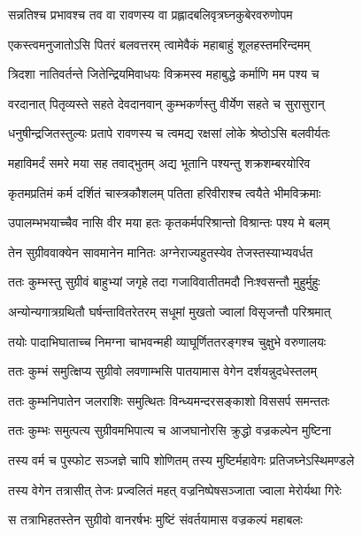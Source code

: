\twolineshloka
{सन्नतिश्च प्रभावश्च तव वा रावणस्य वा}
{प्रह्लादबलिवृत्रघ्नकुबेरवरुणोपम} %

\twolineshloka
{एकस्त्वमनुजातोऽसि पितरं बलवत्तरम्}
{त्वामेवैकं महाबाहुं शूलहस्तमरिन्दमम्} %

\twolineshloka
{त्रिदशा नातिवर्तन्ते जितेन्द्रियमिवाधयः}
{विक्रमस्व महाबुद्धे कर्माणि मम पश्य च} %

\twolineshloka
{वरदानात् पितृव्यस्ते सहते देवदानवान्}
{कुम्भकर्णस्तु वीर्येण सहते च सुरासुरान्} %

\twolineshloka
{धनुषीन्द्रजितस्तुल्यः प्रतापे रावणस्य च}
{त्वमद्य रक्षसां लोके श्रेष्ठोऽसि बलवीर्यतः} %

\twolineshloka
{महाविमर्दं समरे मया सह तवाद्भुतम्}
{अद्य भूतानि पश्यन्तु शक्रशम्बरयोरिव} %

\twolineshloka
{कृतमप्रतिमं कर्म दर्शितं चास्त्रकौशलम्}
{पतिता हरिवीराश्च त्वयैते भीमविक्रमाः} %

\twolineshloka
{उपालम्भभयाच्चैव नासि वीर मया हतः}
{कृतकर्मपरिश्रान्तो विश्रान्तः पश्य मे बलम्} %

\twolineshloka
{तेन सुग्रीववाक्येन सावमानेन मानितः}
{अग्नेराज्यहुतस्येव तेजस्तस्याभ्यवर्धत} %

\twolineshloka
{ततः कुम्भस्तु सुग्रीवं बाहुभ्यां जगृहे तदा}
{गजाविवातीतमदौ निःश्वसन्तौ मुहुर्मुहुः} %

\twolineshloka
{अन्योन्यगात्रग्रथितौ घर्षन्तावितरेतरम्}
{सधूमां मुखतो ज्वालां विसृजन्तौ परिश्रमात्} %

\twolineshloka
{तयोः पादाभिघाताच्च निमग्ना चाभवन्मही}
{व्याघूर्णिततरङ्गश्च चुक्षुभे वरुणालयः} %

\twolineshloka
{ततः कुम्भं समुत्क्षिप्य सुग्रीवो लवणाम्भसि}
{पातयामास वेगेन दर्शयन्नुदधेस्तलम्} %

\twolineshloka
{ततः कुम्भनिपातेन जलराशिः समुत्थितः}
{विन्ध्यमन्दरसङ्काशो विससर्प समन्ततः} %

\twolineshloka
{ततः कुम्भः समुत्पत्य सुग्रीवमभिपात्य च}
{आजघानोरसि क्रुद्धो वज्रकल्पेन मुष्टिना} %

\twolineshloka
{तस्य वर्म च पुस्फोट सञ्जज्ञे चापि शोणितम्}
{तस्य मुष्टिर्महावेगः प्रतिजघ्नेऽस्थिमण्डले} %

\twolineshloka
{तस्य वेगेन तत्रासीत् तेजः प्रज्वलितं महत्}
{वज्रनिष्पेषसञ्जाता ज्वाला मेरोर्यथा गिरेः} %

\twolineshloka
{स तत्राभिहतस्तेन सुग्रीवो वानरर्षभः}
{मुष्टिं संवर्तयामास वज्रकल्पं महाबलः} %

